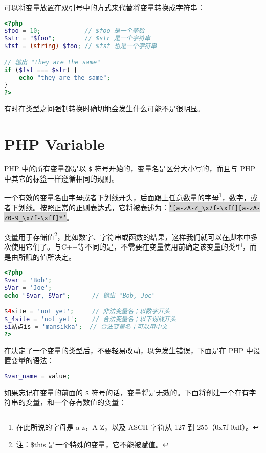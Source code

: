 可以将变量放置在双引号中的方式来代替将变量转换成字符串：


\begin{lstlisting}[language=PHP]
<?php
$foo = 10;            // $foo 是一个整数
$str = "$foo";        // $str 是一个字符串
$fst = (string) $foo; // $fst 也是一个字符串

// 输出 "they are the same"
if ($fst === $str) {
    echo "they are the same";
}
?>
\end{lstlisting}

有时在类型之间强制转换时确切地会发生什么可能不是很明显。




\chapter{PHP Variable}






PHP 中的所有变量都是以 \texttt{\$} 符号开始的，变量名是区分大小写的，而且与 PHP 中其它的标签一样遵循相同的规则。

一个有效的变量名由字母或者下划线开头，后面跟上任意数量的字母\footnote{在此所说的字母是 a-z，A-Z，以及 ASCII 字符从 127 到 255（0x7f-0xff）。}，数字，或者下划线。按照正常的正则表达式，它将被表述为：\colorbox{lightgray}{\texttt{'[a-zA-Z\_\textbackslash x7f-\textbackslash xff][a-zA-Z0-9\_\textbackslash x7f-\textbackslash xff]*'}}。

变量用于存储值\footnote{注：\$this 是一个特殊的变量，它不能被赋值。}，比如数字、字符串或函数的结果，这样我们就可以在脚本中多次使用它们了。与C++等不同的是，不需要在变量使用前确定该变量的类型，而是由所赋的值所决定。

\begin{lstlisting}[language=PHP]
<?php
$var = 'Bob';
$Var = 'Joe';
echo "$var, $Var";      // 输出 "Bob, Joe"

$4site = 'not yet';     // 非法变量名；以数字开头
$_4site = 'not yet';    // 合法变量名；以下划线开头
$i站点is = 'mansikka';  // 合法变量名；可以用中文
?>
\end{lstlisting}


在决定了一个变量的类型后，不要轻易改动，以免发生错误，下面是在 PHP 中设置变量的语法：

\begin{lstlisting}[language=PHP]
$var_name = value;
\end{lstlisting}



如果忘记在变量的前面的 \texttt{\$} 符号的话，变量将是无效的。下面将创建一个存有字符串的变量，和一个存有数值的变量：


